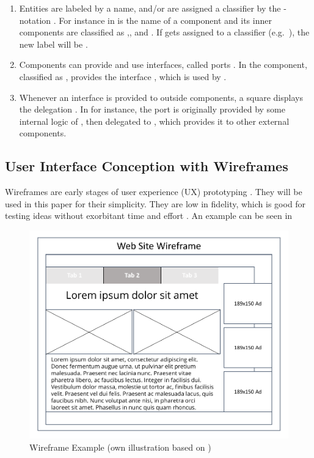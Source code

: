 \begin{enumerate}
    \item Entities are labeled by a name, and/or are assigned a  classifier by the \ssay{:[classifier]}-notation  \parencite[cf.][125]{ObjectManagementGroup.01.03.2015}. For instance in   is the name of a component and its inner components are classified as ,, and . If  gets assigned to a classifier (e.g.~), the new label will be .
    
    \item Components can provide and use interfaces, called ports \parencite[cf.][182-184]{ObjectManagementGroup.01.03.2015}. In  the component, classified as , provides the interface , which is used by .
    
    \item Whenever an interface is provided to outside components, a square displays the delegation \parencite[cf.][212]{ObjectManagementGroup.01.03.2015}. In  for instance, the port  is originally provided by some internal logic of , then delegated to , which provides it to other external components. 
\end{enumerate}


\subsection{User Interface Conception with Wireframes}

Wireframes are early stages of user experience (UX) prototyping \parencite[cf.][]{Rosenzweig.2015}. They will be used in this paper for their simplicity. They are low in fidelity, which is good for testing ideas without exorbitant time and effort \parencite[cf.][]{Platt.2016}. An example can be seen in 

\begin{figure}[H]
    \centering
    \includegraphics[height=.5\textheight]{img/WireFrameEx.pdf}
    \caption[Wireframe Example]{Wireframe Example (own illustration based on \cite{Rosenzweig.2015})}
    \label{fig:wrEx}
\end{figure}